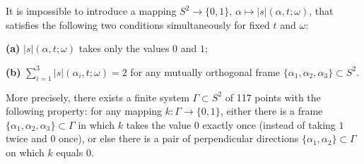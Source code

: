 It is impossible to introduce a mapping $S^2 \to \{0,1\}$, $\alpha \mapsto |s|(\alpha, t; \omega)$, that satisfies the following two conditions simultaneously for fixed $t$ and $\omega$:

\textbf{(a)} $|s|(\alpha, t; \omega)$ takes only the values $0$ and $1$;

\textbf{(b)} $\sum_{i=1}^{3} |s|(\alpha_i, t; \omega) = 2$ for any mutually orthogonal frame $\{\alpha_1, \alpha_2, \alpha_3\} \subset S^2$.

More precisely, there exists a finite system $\Gamma \subset S^2$ of 117 points with the following property: for any mapping $k: \Gamma \to \{0,1\}$, either there is a frame $\{\alpha_1, \alpha_2, \alpha_3\} \subset \Gamma$ in which $k$ takes the value $0$ exactly once (instead of taking $1$ twice and $0$ once), or else there is a pair of perpendicular directions $\{\alpha_1, \alpha_2\} \subset \Gamma$ on which $k$ equals $0$.
